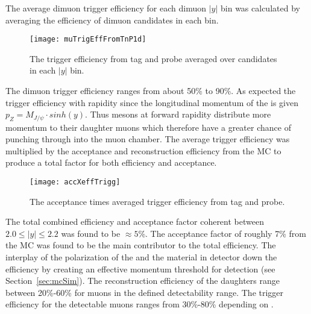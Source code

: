       The average dimuon trigger efficiency for each dimuon \DIFdelbegin \DIFdel{(}%
\DIFdel{,}\DIFdelend $|y|$ \DIFdelbegin \DIFdel{) }\DIFdelend bin
        was calculated by averaging the efficiency of dimuon candidates in each
        bin. 
      \begin{figure}[!Hhbt]
        \centering
        \DIFdelbeginFL %
\DIFdelendFL \DIFaddbeginFL \texttt{[image: muTrigEffFromTnP1d]}
        \DIFaddendFL \caption{The trigger efficiency from tag and probe averaged over candidates
          in each \DIFdelbeginFL \DIFdelFL{(}%
\DIFdelFL{,}\DIFdelendFL $|y|$ \DIFdelbeginFL \DIFdelFL{) }\DIFdelendFL bin.}
        \DIFdelbeginFL %
\DIFdelendFL \DIFaddbeginFL \label{fig:triggerEffDiMu}
      \DIFaddendFL \end{figure}
      The dimuon trigger efficiency ranges from about 50\% to 90\%. 
      As expected the \JPsi{} trigger efficiency \DIFdelbegin {}\DIFdelend \DIFaddbegin {}\DIFaddend with rapidity since 
        the longitudinal momentum of the \JPsi{} is given \DIFaddbegin {}\DIFaddend $p_Z= M_{J/\psi} \cdot sinh(y)$. 
      Thus \JPsi{} mesons at forward rapidity distribute more momentum to their
        daughter muons which therefore have a greater chance of punching 
        through into the muon chamber.  
      The average trigger efficiency was multiplied by the acceptance and 
        reconstruction efficiency from the MC to produce a total factor for 
        both efficiency and acceptance. 
      \begin{figure}[!Hhtb]
        \centering
        \DIFdelbeginFL %
\DIFdelendFL \DIFaddbeginFL \texttt{[image: accXeffTrigg]}
        \DIFaddendFL \caption{The acceptance times averaged trigger efficiency from tag and 
          probe.}
        \DIFdelbeginFL %
\DIFdelendFL \DIFaddbeginFL \label{fig:averageExA}
      \DIFaddendFL \end{figure}

      The total combined efficiency and acceptance factor \DIFaddbegin {}\DIFaddend coherent \JPsi{} 
        between $2.0 \le |y| \le 2.2$ was found to be $\approx 5$\%.
      The acceptance factor of roughly 7\% from the MC was found to be the main
        contributor to the total efficiency. 
      The interplay of the polarization of the \JPsi{} and the material in 
        detector \DIFdelbegin {}\DIFdelend \DIFaddbegin {}\DIFaddend down the efficiency by creating an effective momentum 
        threshold for detection (see Section~\ref{sec:mcSim}).
      The reconstruction efficiency of the daughters range between 
        20\%-60\% for muons in the defined detectability range. 
      The trigger efficiency for the detectable muons ranges from 30\%-80\% 
        depending on \pt{}. 

